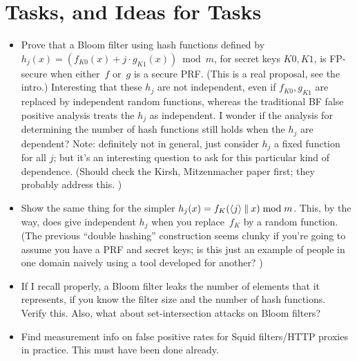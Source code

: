 \section{Tasks, and Ideas for Tasks}

\begin{itemize}
\item Prove that a Bloom filter using hash functions defined by $h_j(x) = \left( f_{K0}(x) + j\cdot g_{K1}(x)\right) \bmod m$, for secret keys $K0,K1$, is FP-secure when either~$f$ or~$g$ is a secure PRF.  (This is a real proposal, see the intro.)  Interesting that these $h_j$ are not independent, even if $f_{K0},g_{K1}$ are replaced by independent random functions, whereas the traditional BF false positive analysis treats the $h_j$ as independent.  I wonder if the analysis for determining the number of hash functions still holds when the $h_j$ are dependent?  Note: definitely not in general, just consider $h_j$ a fixed function for all $j$; but it's an interesting question to ask for this particular kind of dependence.  (Should check the Kirsh, Mitzenmacher paper first; they probably address this. ) 

\item Show the same thing for the simpler $h_j(x) = f_{K}(\langle j \rangle \: \| \: x) \bmod m$.  This, by the way, does give independent $h_j$ when you replace~$f_K$ by a random function.  (The previous ``double hashing'' construction seems clunky if you're going to assume you have a PRF and secret keys; is this just an example of people in one domain naively using a tool developed for another? )

\item  If I recall properly, a Bloom filter leaks the number of elements that it represents, if you know the filter size and the number of hash functions.  Verify this.  Also, what about set-intersection attacks on Bloom filters?

\item Find measurement info on false positive rates for Squid filters/HTTP proxies in practice.  This must have been done already.


\end{itemize}
